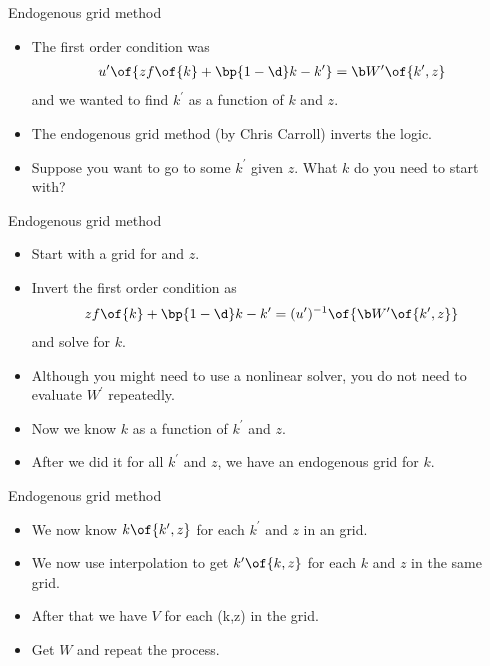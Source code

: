 \documentclass[11pt,xcolor={dvipsnames},aspectratio=159,hyperref={pdftex,pdfpagemode=UseNone,hidelinks,pdfdisplaydoctitle=true},usepdftitle=false]{beamer}
\begin{document}
            \begin{frame}{Endogenous grid method}   
                \begin{itemize}
                    \item The first order condition was 
                    \begin{align*}
                        u^\prime\of{z f\of{k} + \bp{1-\d}k - k^\prime} = \b W^\prime\of{k^\prime,z}
                    \end{align*}
                    and we wanted to find $k^\prime$ as a function of $k$ and $z$.
                    \item The endogenous grid method (by Chris Carroll) inverts the logic. 
                    \item Suppose you want to go to some $k^\prime$ given $z$. What $k$ do you need to start with?
                \end{itemize}
                \end{frame}       


            \begin{frame}{Endogenous grid method}   
                \begin{itemize}
                    \item Start with a grid for  and $z$.
                    \item Invert the first order condition as 
                    \begin{align*}
                        z f\of{k} + \bp{1-\d}k - k^\prime = (u^\prime)^{-1} \of{\b W^\prime\of{k^\prime,z}}
                    \end{align*}
                    and solve for $k$.
                    \item Although you might need to use a nonlinear solver, you do not need to evaluate $W^\prime$ repeatedly.
                    \item Now we know $k$ as a function of $k^\prime$ and $z$.
                    \item After we did it for all $k^\prime$ and $z$, we have an endogenous grid for $k$.
                \end{itemize}
                \end{frame}       

            \begin{frame}{Endogenous grid method}   
                \begin{itemize}
                    \item We now know $k\of{k^\prime,z}$ for each $k^\prime$ and $z$ in an  grid. 
                    \item We now use interpolation to get $k^\prime\of{k,z}$ for each $k$ and $z$ in the same  grid. 
                    \item After that we have $V$ for each (k,z) in the  grid.
                    \item Get $W$ and repeat the process.
                \end{itemize}
                \end{frame}       
\end{document}
